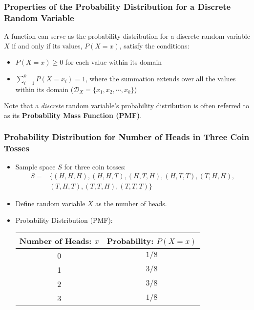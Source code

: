 \documentclass[handout]{beamer} %
\begin{document}

\begin{frame}
\frametitle{Properties of the Probability Distribution for a Discrete Random Variable}

A function can serve as the probability distribution for a discrete random variable \( X \) if and only if its values, \( P(X=x) \), satisfy the conditions:
\pause  \vspace{1.0em}
    \begin{itemize}
        \item \( P(X=x) \geq 0 \) for each value within its domain \pause \vspace{1.0em}
        \item \( \sum_{i =1}^{k} P(X=x_i) = 1 \), where the summation extends over all the values within its domain ($\mathcal{D}_X = \{x_1, x_2, \cdots, x_k\}$) \pause \vspace{1.0em}
    \end{itemize}

Note that a \emph{discrete} random variable's probability distribution is often referred to as its \textbf{Probability Mass Function (PMF)}.

\end{frame}


\begin{frame}
    \frametitle{Probability Distribution for Number of Heads in Three Coin Tosses}
    \begin{itemize}
        \item Sample space \( S \) for three coin tosses: \pause
        \begin{align*}
        S =& \big\{ (H, H, H), (H, H, T), (H, T, H), (H, T, T), (T, H, H), \\\
        & (T, H, T), (T, T, H), (T, T, T) \big\}
        \end{align*}
        \vspace{-1.7em}
        \pause
        \item Define random variable \( X \) as the number of heads. \pause
        \item Probability Distribution (PMF):
        \begin{table}
            \centering
            \begin{tabular}{|c|c|}
                \hline
                \textbf{Number of Heads: $x$} & \textbf{Probability: $P(X=x)$} \\
                \hline
                0 & \( 1/8 \) \pause \\
                1 & \( 3/8 \) \pause \\
                2 & \( 3/8 \) \pause \\
                3 & \( 1/8 \) \pause \\
                \hline
            \end{tabular}
        \end{table}
    \end{itemize}
\end{frame}
\end{document}
